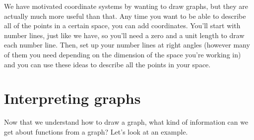 \documentclass{ximera}
\begin{document}
We have motivated coordinate systems by wanting to draw graphs, but they are actually much more useful than that. Any time you want to be able to describe all of the points in a certain space, you can add coordinates. You'll start with number lines, just like we have, so you'll need a zero and a unit length to draw each number line. Then, set up your number lines at right angles (however many of them you need depending on the dimension of the space you're working in) and you can use these ideas to describe all the points in your space.



\section{Interpreting graphs}
Now that we understand how to draw a graph, what kind of information can we get about functions from a graph? Let's look at an example.
\end{document}
